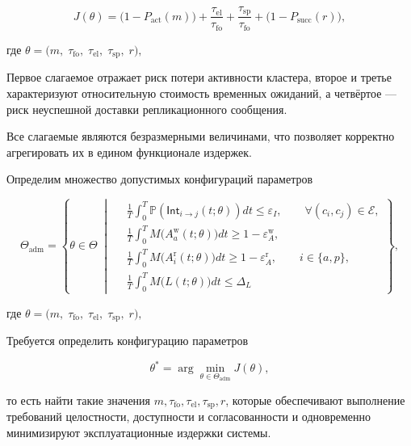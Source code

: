 \begin{equation}
J(\theta)
=
\bigl(1-P_{\mathrm{act}}(m)\bigr)
+
\frac{\tau_{\mathrm{el}}}{\tau_{\mathrm{fo}}}
+
\frac{\tau_{\mathrm{sp}}}{\tau_{\mathrm{fo}}}
+
\bigl(1-P_{\mathrm{succ}}(r)\bigr),
\label{eq:J_final}
\end{equation}

где
$
\theta=
\bigl(
m,\;
\tau_{\mathrm{fo}},\;
\tau_{\mathrm{el}},\;
\tau_{\mathrm{sp}},\;
r
\bigr),
$

Первое слагаемое отражает риск потери активности кластера,
второе и третье характеризуют относительную стоимость временных ожиданий,
а четвёртое — риск неуспешной доставки репликационного сообщения.

Все слагаемые являются безразмерными величинами,
что позволяет корректно агрегировать их
в едином функционале издержек.

Определим множество допустимых конфигураций параметров

\[
\Theta_{\mathrm{adm}}
=
\left\{
\theta\in\Theta
\;\middle|\;
\begin{aligned}
&\frac{1}{T}\int_0^T
\mathbb{P}\!\left(\mathsf{Int}_{i\to j}(t;\theta)\right)dt
\le\varepsilon_I,
\qquad \forall (c_i,c_j)\in\mathcal{E},\\[0.4em]
&\frac{1}{T}\int_0^T
M\big(A_a^{\mathrm{w}}(t;\theta)\big)dt
\ge 1-\varepsilon_A^{\mathrm{w}},\\[0.4em]
&\frac{1}{T}\int_0^T
M\big(A_i^{\mathrm{r}}(t;\theta)\big)dt
\ge 1-\varepsilon_A^{\mathrm{r}},
\qquad i\in\{a,p\},\\[0.4em]
&\frac{1}{T}\int_0^T
M\big(L(t;\theta)\big)dt
\le \Delta_L
\end{aligned}
\right\},
\]

где 
$
\theta=
\bigl(
m,\;
\tau_{\mathrm{fo}},\;
\tau_{\mathrm{el}},\;
\tau_{\mathrm{sp}},\;
r
\bigr),
$

Требуется определить конфигурацию параметров

\[
\theta^{*}
=
\arg\min_{\theta\in\Theta_{\mathrm{adm}}}
J(\theta),
\]

то есть найти такие значения
$m,\tau_{\mathrm{fo}},\tau_{\mathrm{el}},\tau_{\mathrm{sp}},r$,
которые обеспечивают выполнение требований
целостности, доступности и согласованности
и одновременно минимизируют эксплуатационные издержки системы.
